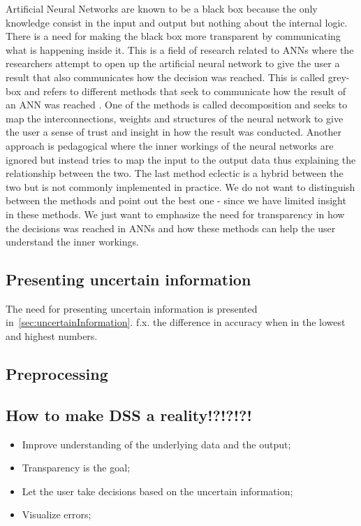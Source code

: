 Artificial Neural Networks are known to be a black box \cite{fromBlackBoxToTransparentBox} because the only knowledge consist in the input and output but nothing about the internal logic. There is a need for making the black box more transparent by communicating what is happening inside it. This is a field of research related to ANNs where the researchers attempt to open up the artificial neural network to give the user a result that also communicates how the decision was reached. This is called grey-box and refers to different methods that seek to communicate how the result of an ANN was reached \cite{young2010using}. One of the methods is called decomposition and seeks to map the interconnections, weights and structures of the neural network to give the user a sense of trust and insight in how the result was conducted. Another approach is pedagogical where the inner workings of the neural networks are ignored but instead tries to map the input to the output data thus explaining the relationship between the two. The last method eclectic is a hybrid between the two but is not commonly implemented in practice. We do not want to distinguish between the methods and point out the best one - since we have limited insight in these methods. We just want to emphasize the need for transparency in how the decisions was reached in ANNs and how these methods can help the user understand the inner workings.

\subsection{Presenting uncertain information}
The need for presenting uncertain information is presented in~\ref{sec:uncertainInformation}.
f.x. the difference in accuracy when in the lowest and highest numbers.

\subsection{Preprocessing}

\subsection{How to make DSS a reality!?!?!?!}
\begin{itemize}
\item Improve understanding of the underlying data and the output;
\item Transparency is the goal;
\item Let the user take decisions based on the uncertain information;
\item Visualize errors;
\end{itemize}

